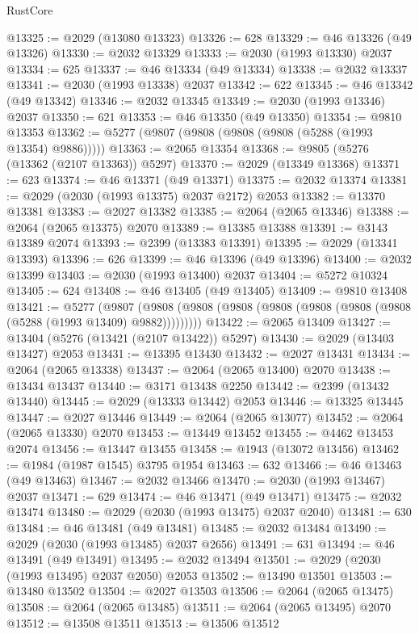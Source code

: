 \begin{lexlean}{RustCore}
\begin{coremodule}
@13325 := @2029 (@13080 @13323)
@13326 := 628
@13329 := @46 @13326 (@49 @13326)
@13330 := @2032 @13329
@13333 := @2030 (@1993 @13330) @2037
@13334 := 625
@13337 := @46 @13334 (@49 @13334)
@13338 := @2032 @13337
@13341 := @2030 (@1993 @13338) @2037
@13342 := 622
@13345 := @46 @13342 (@49 @13342)
@13346 := @2032 @13345
@13349 := @2030 (@1993 @13346) @2037
@13350 := 621
@13353 := @46 @13350 (@49 @13350)
@13354 := @9810 @13353
@13362 := @5277 (@9807 (@9808 (@9808 (@9808 (@5288 (@1993 @13354) @9886)))))
@13363 := @2065 @13354
@13368 := @9805 (@5276 (@13362 (@2107 @13363)) @5297)
@13370 := @2029 (@13349 @13368)
@13371 := 623
@13374 := @46 @13371 (@49 @13371)
@13375 := @2032 @13374
@13381 := @2029 (@2030 (@1993 @13375) @2037 @2172) @2053
@13382 := @13370 @13381
@13383 := @2027 @13382
@13385 := @2064 (@2065 @13346)
@13388 := @2064 (@2065 @13375) @2070
@13389 := @13385 @13388
@13391 := @3143 @13389 @2074
@13393 := @2399 (@13383 @13391)
@13395 := @2029 (@13341 @13393)
@13396 := 626
@13399 := @46 @13396 (@49 @13396)
@13400 := @2032 @13399
@13403 := @2030 (@1993 @13400) @2037
@13404 := @5272 @10324
@13405 := 624
@13408 := @46 @13405 (@49 @13405)
@13409 := @9810 @13408
@13421 := @5277
    (@9807 (@9808 (@9808 (@9808 (@9808 (@9808 (@9808 (@9808 (@5288 (@1993 @13409) @9882)))))))))
@13422 := @2065 @13409
@13427 := @13404 (@5276 (@13421 (@2107 @13422)) @5297)
@13430 := @2029 (@13403 @13427) @2053
@13431 := @13395 @13430
@13432 := @2027 @13431
@13434 := @2064 (@2065 @13338)
@13437 := @2064 (@2065 @13400) @2070
@13438 := @13434 @13437
@13440 := @3171 @13438 @2250
@13442 := @2399 (@13432 @13440)
@13445 := @2029 (@13333 @13442) @2053
@13446 := @13325 @13445
@13447 := @2027 @13446
@13449 := @2064 (@2065 @13077)
@13452 := @2064 (@2065 @13330) @2070
@13453 := @13449 @13452
@13455 := @4462 @13453 @2074
@13456 := @13447 @13455
@13458 := @1943 (@13072 @13456)
@13462 := @1984 (@1987 @1545) @3795 @1954
@13463 := 632
@13466 := @46 @13463 (@49 @13463)
@13467 := @2032 @13466
@13470 := @2030 (@1993 @13467) @2037
@13471 := 629
@13474 := @46 @13471 (@49 @13471)
@13475 := @2032 @13474
@13480 := @2029 (@2030 (@1993 @13475) @2037 @2040)
@13481 := 630
@13484 := @46 @13481 (@49 @13481)
@13485 := @2032 @13484
@13490 := @2029 (@2030 (@1993 @13485) @2037 @2656)
@13491 := 631
@13494 := @46 @13491 (@49 @13491)
@13495 := @2032 @13494
@13501 := @2029 (@2030 (@1993 @13495) @2037 @2050) @2053
@13502 := @13490 @13501
@13503 := @13480 @13502
@13504 := @2027 @13503
@13506 := @2064 (@2065 @13475)
@13508 := @2064 (@2065 @13485)
@13511 := @2064 (@2065 @13495) @2070
@13512 := @13508 @13511
@13513 := @13506 @13512

\end{coremodule}
\end{lexlean}
